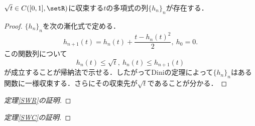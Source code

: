 \documentclass[uplatex]{jsarticle}
\begin{document}
\begin{lemma}
    $\sqrt{t}\in C([0,1],\setR)$に収束する$t$の多項式の列$\{h_n\}_n$が存在する．
\end{lemma}
\begin{proof}
    $\{h_n\}_n$を次の漸化式で定める．
    \[ h_{n+1}(t) = h_n(t) + \frac{t-h_n(t)^2}{2},\ h_0=0. \]
    この関数列について
    \[ h_n(t)\leq \sqrt{t},\  h_n(t)\leq h_{n+1}(t) \]
    が成立することが帰納法で示せる．したがってDiniの定理によって$\{h_n\}_n$はある関数に一様収束する．さらにその収束先が$\sqrt{t}$であることが分かる．
\end{proof}

\begin{proof}[定理\ref{SWR}の証明]

\end{proof}

\begin{proof}[定理\ref{SWC}の証明]

\end{proof}
\end{document}
